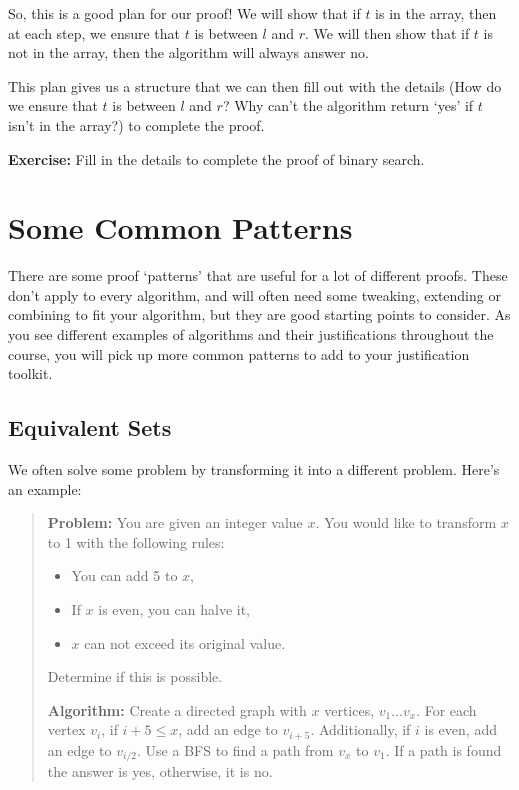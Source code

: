 \documentclass[12pt]{article}
\begin{document}
\begin{question}
So, this is a good plan for our proof! We will show that if $t$ is in the array, then at each step, we ensure that $t$ is between $l$ and $r$. We will then show that if $t$ is not in the array, then the algorithm will always answer no.

This plan gives us a structure that we can then fill out with the details (How do we ensure that $t$ is between $l$ and $r$? Why can't the algorithm return `yes' if $t$ isn't in the array?) to complete the proof.

\textbf{Exercise:} Fill in the details to complete the proof of binary search.

\section*{Some Common Patterns}
There are some proof `patterns' that are useful for a lot of different proofs. These don't apply to every algorithm, and will often need some tweaking, extending or combining to fit your algorithm, but they are good starting points to consider. As you see different examples of algorithms and their justifications throughout the course, you will pick up more common patterns to add to your justification toolkit. 

\subsection*{Equivalent Sets}
We often solve some problem by transforming it into a different problem. Here's an example:
\begin{quote}
    \textbf{Problem:} You are given an integer value $x$. You would like to transform $x$ to 1 with the following rules:
    \begin{itemize}
        \item You can add 5 to $x$,
        \item If $x$ is even, you can halve it,
        \item $x$ can not exceed its original value.
    \end{itemize} 
    Determine if this is possible.
    
    \textbf{Algorithm:} Create a directed graph with $x$ vertices, $v_1 \dots v_x$. For each vertex $v_i$, if $i +5 \leq  x$, add an edge to $v_{i+5}$. Additionally, if $i$ is even, add an edge to $v_{i/2}$. Use a BFS to find a path from $v_x$ to $v_1$. If a path is found the answer is yes, otherwise, it is no.
\end{quote}


\end{question}
\end{document}
